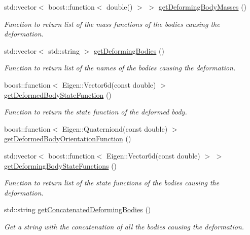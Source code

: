 \begin{DoxyCompactItemize}
std\+::vector$<$ boost\+::function$<$ double() $>$ $>$ \hyperlink{classtudat_1_1gravitation_1_1BasicSolidBodyTideGravityFieldVariations_a8bcc5c47e45ad462c29946502ae53eea}{get\+Deforming\+Body\+Masses} ()
\begin{DoxyCompactList}\small\item\em Function to return list of the mass functions of the bodies causing the deformation. \end{DoxyCompactList}\item 
std\+::vector$<$ std\+::string $>$ \hyperlink{classtudat_1_1gravitation_1_1BasicSolidBodyTideGravityFieldVariations_a53c768e15c3aeff85f74986dc8a9567c}{get\+Deforming\+Bodies} ()
\begin{DoxyCompactList}\small\item\em Function to return list of the names of the bodies causing the deformation. \end{DoxyCompactList}\item 
boost\+::function$<$ Eigen\+::\+Vector6d(const double) $>$ \hyperlink{classtudat_1_1gravitation_1_1BasicSolidBodyTideGravityFieldVariations_ad4126a4f0fc3ebe5c0387a0825701ce9}{get\+Deformed\+Body\+State\+Function} ()
\begin{DoxyCompactList}\small\item\em Function to return the state function of the deformed body. \end{DoxyCompactList}\item 
boost\+::function$<$ Eigen\+::\+Quaterniond(const double) $>$ \hyperlink{classtudat_1_1gravitation_1_1BasicSolidBodyTideGravityFieldVariations_acf37c94f155bef85a68f6bb2f5dd870b}{get\+Deformed\+Body\+Orientation\+Function} ()
\item 
std\+::vector$<$ boost\+::function$<$ Eigen\+::\+Vector6d(const double) $>$ $>$ \hyperlink{classtudat_1_1gravitation_1_1BasicSolidBodyTideGravityFieldVariations_a27b0a1a1a38f110929aaca4e88216b70}{get\+Deforming\+Body\+State\+Functions} ()
\begin{DoxyCompactList}\small\item\em Function to return list of the state functions of the bodies causing the deformation. \end{DoxyCompactList}\item 
std\+::string \hyperlink{classtudat_1_1gravitation_1_1BasicSolidBodyTideGravityFieldVariations_a7639715b2180ffa04ca76032c0b99860}{get\+Concatenated\+Deforming\+Bodies} ()
\begin{DoxyCompactList}\small\item\em Get a string with the concatenation of all the bodies causing the deformation. \end{DoxyCompactList}\item 

\end{DoxyCompactItemize}
